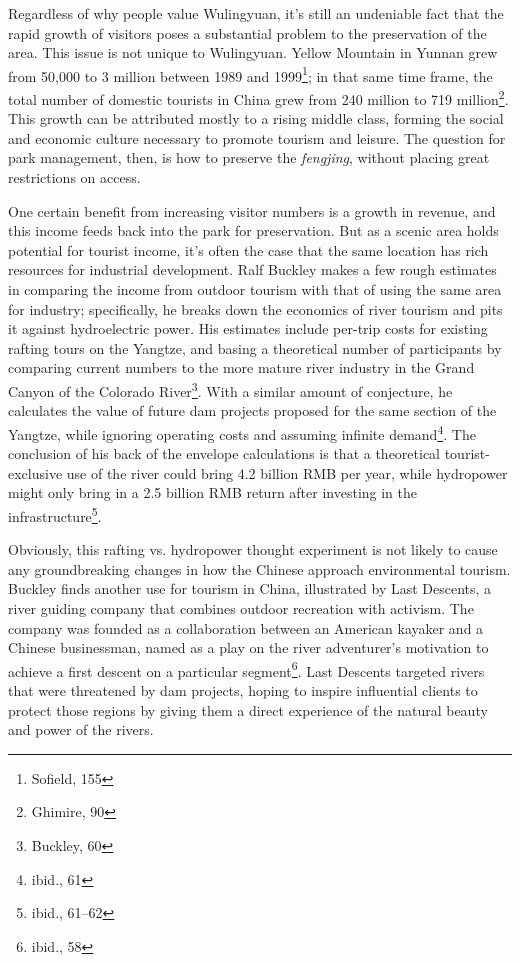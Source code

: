 Regardless of why people value Wulingyuan, it's still an undeniable fact that
the rapid growth of visitors poses a substantial problem to the preservation of
the area. This issue is not unique to Wulingyuan. Yellow Mountain in Yunnan grew
from 50,000 to 3 million between 1989 and 1999\footnote{Sofield, 155}; in that
same time frame, the total number of domestic tourists in China grew from 240
million to 719 million\footnote{Ghimire, 90}. This growth can be attributed
mostly to a rising middle class, forming the social and economic culture
necessary to promote tourism and leisure. The question for park management,
then, is how to preserve the \textit{fengjing}, without placing great
restrictions on access.

One certain benefit from increasing visitor numbers is a growth in revenue, and
this income feeds back into the park for preservation. But as a scenic area
holds potential for tourist income, it's often the case that the same location
has rich resources for industrial development. Ralf Buckley makes a few rough
estimates in comparing the income from outdoor tourism with that of using the
same area for industry; specifically, he breaks down the economics of river
tourism and pits it against hydroelectric power. His estimates include per-trip
costs for existing rafting tours on the Yangtze, and basing a theoretical number
of participants by comparing current numbers to the more mature river industry
in the Grand Canyon of the Colorado River\footnote{Buckley, 60}. With a similar
amount of conjecture, he calculates the value of future  dam projects proposed
for the same section of the Yangtze, while ignoring operating costs and assuming
infinite demand\footnote{ibid., 61}. The conclusion of his back of the envelope
calculations is that a theoretical tourist-exclusive use of the river could
bring 4.2 billion RMB per year, while hydropower might only bring in a 2.5
billion RMB return after investing in the infrastructure\footnote{ibid.,
61--62}.

Obviously, this rafting vs. hydropower thought experiment is not likely to cause
any groundbreaking changes in how the Chinese approach environmental
tourism.
Buckley finds another use for tourism in China, illustrated by Last Descents, a
river guiding company that combines outdoor recreation with activism. The
company was founded as a collaboration between an American kayaker and a Chinese
businessman, named as a play on the river adventurer's motivation to achieve a
first descent on a particular segment\footnote{ibid., 58}. Last Descents
targeted rivers that were threatened by dam projects, hoping to inspire
influential clients to protect those regions by giving them a direct experience
of the natural beauty and power of the rivers.

